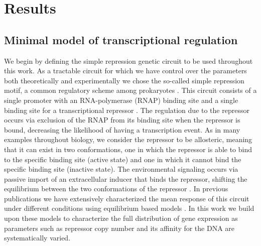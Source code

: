 \section{Results}

\subsection{Minimal model of transcriptional regulation}\label{sec_model}

We begin by defining the simple repression genetic circuit to be used throughout
this work. As a tractable circuit for which we have control over the parameters
both theoretically and experimentally we chose the so-called simple  repression
motif, a common regulatory scheme among prokaryotes \cite{Rydenfelt2014}. This
circuit consists of a single promoter with an RNA-polymerase (RNAP) binding site
and a single binding site for a transcriptional repressor \cite{Garcia2011c}.
The regulation due to the repressor occurs via exclusion of the RNAP from its
binding site when the repressor is bound, decreasing the likelihood of having a
transcription event. As in many examples throughout biology, we consider the
repressor to be allosteric, meaning that it can exist in two conformations, one
in which the repressor is able to bind to the specific binding site (active
state) and one in which it cannot bind the specific binding site (inactive
state). The environmental signaling occurs via passive import of an
extracellular inducer that binds the repressor, shifting the equilibrium between
the two conformations of the repressor \cite{Razo-Mejia2018}. In previous
publications we have extensively characterized the mean response of this circuit
under different conditions using equilibrium based models . In this work we build upon these models to characterize the full
distribution of gene expression as parameters such as repressor copy number and
its affinity for the DNA are systematically varied.

